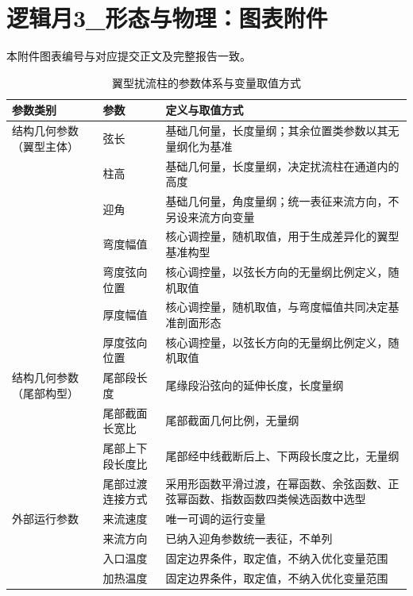 \documentclass[stage2,fontset=fandol]{ydzjreport}
\begin{document}
\section*{逻辑月3\_形态与物理：图表附件}
本附件图表编号与对应提交正文及完整报告一致。\par\clearpage
\setcounter{table}{0}
\begin{table}[H]\centering
\small
\renewcommand{\arraystretch}{1.12}
\caption{翼型扰流柱的参数体系与变量取值方式}\label{tab:param-vars}
\begin{tabularx}{\textwidth}{@{}>{\RaggedRight\arraybackslash}p{} Y Y@{}}
\toprule
{} 参数类别 & 参数 & 定义与取值方式 \\
\midrule
结构几何参数（翼型主体） & 弦长 & 基础几何量，长度量纲；其余位置类参数以其无量纲化为基准 \\[3pt]
& 柱高 & 基础几何量，长度量纲，决定扰流柱在通道内的高度 \\[3pt]
& 迎角 & 基础几何量，角度量纲；统一表征来流方向，不另设来流方向变量 \\[3pt]
& 弯度幅值 & 核心调控量，随机取值，用于生成差异化的翼型基准构型 \\[3pt]
& 弯度弦向位置 & 核心调控量，以弦长方向的无量纲比例定义，随机取值 \\[3pt]
& 厚度幅值 & 核心调控量，随机取值，与弯度幅值共同决定基准剖面形态 \\[3pt]
& 厚度弦向位置 & 核心调控量，以弦长方向的无量纲比例定义，随机取值 \\[3pt]
\midrule
结构几何参数（尾部构型） & 尾部段长度 & 尾缘段沿弦向的延伸长度，长度量纲 \\[3pt]
& 尾部截面长宽比 & 尾部截面几何比例，无量纲 \\[3pt]
& 尾部上下段长度比 & 尾部经中线截断后上、下两段长度之比，无量纲 \\[3pt]
& 尾部过渡连接方式 & 采用形函数平滑过渡，在幂函数、余弦函数、正弦幂函数、指数函数四类候选函数中选型 \\[3pt]
\midrule
外部运行参数 & 来流速度 & 唯一可调的运行变量 \\[3pt]
& 来流方向 & 已纳入迎角参数统一表征，不单列 \\[3pt]
& 入口温度 & 固定边界条件，取定值，不纳入优化变量范围 \\[3pt]
& 加热温度 & 固定边界条件，取定值，不纳入优化变量范围 \\[3pt]
\bottomrule\end{tabularx}\end{table}
\clearpage
\setcounter{table}{1}
\end{document}
